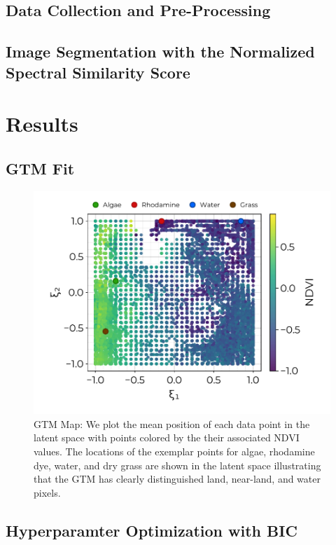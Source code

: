\documentclass[remotesensing,article,submit,pdftex,moreauthors]{Definitions/mdpi}
\begin{document}
\subsection{Data Collection and Pre-Processing}


\subsection{Image Segmentation with the Normalized Spectral Similarity Score}



\section{Results}

\subsection{GTM Fit}

\begin{figure}[t]
\centering
\includegraphics[width=0.8\columnwidth]{paper/figures/results/square-ndvi.pdf}
\caption{GTM Map: We plot the mean position of each data point in the latent space with points colored by the their associated NDVI values. The locations of the exemplar points for algae, rhodamine dye, water, and dry grass are shown in the latent space illustrating that the GTM has clearly distinguished land, near-land, and water pixels.\label{fig:}}
\end{figure}  


\subsection{Hyperparamter Optimization with BIC}
\end{document}
